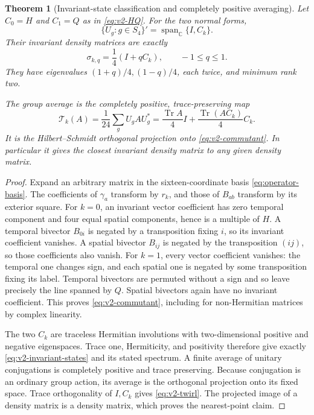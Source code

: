 \documentclass[11pt]{article}
\newtheorem{theorem}{Theorem}[section]
\theoremstyle{definition}
\theoremstyle{remark}
\newcommand{\C}{\mathbb C}
\newcommand{\Tr}{\operatorname{Tr}}
\newcommand{\Span}{\operatorname{span}}
\begin{document}
\begin{theorem}[Invariant-state classification and completely positive averaging]
\label{thm:v2-twirl}
Let $C_0=H$ and $C_1=Q$ as in \eqref{eq:v2-HQ}. For the two normal forms,
\begin{equation}
 \{U_g:g\in S_4\}'=\Span_\C\{I,C_k\}.
 \label{eq:v2-commutant}
\end{equation}
Their invariant density matrices are exactly
\begin{equation}
 \boxed{\sigma_{k,q}=\frac14(I+qC_k),\qquad -1\le q\le1.}
 \label{eq:v2-invariant-states}
\end{equation}
They have eigenvalues $(1+q)/4,(1-q)/4$, each twice, and minimum rank two.

The group average is the completely positive, trace-preserving map
\begin{equation}
 \boxed{\mathcal T_k(A)=\frac1{24}\sum_g U_g A U_g^*
 =\frac{\Tr A}{4}I+\frac{\Tr(AC_k)}4 C_k.}
 \label{eq:v2-twirl}
\end{equation}
It is the Hilbert--Schmidt orthogonal projection onto
\eqref{eq:v2-commutant}. In particular it gives the closest invariant
density matrix to any given density matrix.
\end{theorem}
\begin{proof}
Expand an arbitrary matrix in the sixteen-coordinate basis
\eqref{eq:operator-basis}. The coefficients of $\gamma_a$ transform by
$r_k$, and those of $B_{ab}$ transform by its exterior square.
For $k=0$, an invariant vector coefficient has zero temporal component and
four equal spatial components, hence is a multiple of $H$. A temporal
bivector $B_{0i}$ is negated by a transposition fixing $i$, so its invariant
coefficient vanishes. A spatial bivector $B_{ij}$ is negated by the
transposition $(ij)$, so those coefficients also vanish.
For $k=1$, every vector coefficient vanishes: the temporal one changes
sign, and each spatial one is negated by some transposition fixing its label.
Temporal bivectors are permuted without a sign and so leave precisely the
line spanned by $Q$. Spatial bivectors again have no invariant coefficient.
This proves \eqref{eq:v2-commutant}, including for non-Hermitian matrices
by complex linearity.

The two $C_k$ are traceless Hermitian involutions with two-dimensional
positive and negative eigenspaces. Trace one, Hermiticity, and positivity
therefore give exactly \eqref{eq:v2-invariant-states} and its stated
spectrum. A finite average of unitary conjugations is completely positive
and trace preserving. Because conjugation is an ordinary group action, its
average is the orthogonal projection onto its fixed space. Trace
orthogonality of $I,C_k$ gives \eqref{eq:v2-twirl}. The projected image of a
density matrix is a density matrix, which proves the nearest-point claim.
\end{proof}
\end{document}
